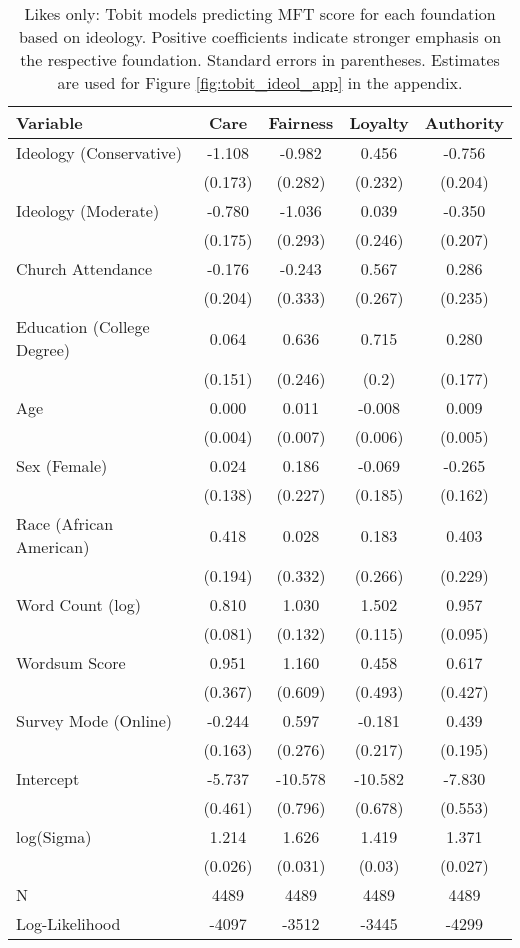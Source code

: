 \begin{table}[ht]
\centering
\caption{Likes only: Tobit models predicting MFT score for each foundation based 
           on ideology. Positive coefficients indicate stronger emphasis on the respective 
           foundation. Standard errors in parentheses. Estimates are used for 
           Figure \ref{fig:tobit_ideol_app} in the appendix.} 
\label{tab:tobit_like}
\begingroup\footnotesize
\begin{tabular}{lcccc}
  \hline
Variable & Care & Fairness & Loyalty & Authority \\ 
  \hline
Ideology (Conservative) & -1.108 &  -0.982 &   0.456 & -0.756 \\ 
   & (0.173) & (0.282) & (0.232) & (0.204) \\ 
  Ideology (Moderate) & -0.780 &  -1.036 &   0.039 & -0.350 \\ 
   & (0.175) & (0.293) & (0.246) & (0.207) \\ 
  Church Attendance & -0.176 &  -0.243 &   0.567 &  0.286 \\ 
   & (0.204) & (0.333) & (0.267) & (0.235) \\ 
  Education (College Degree) &  0.064 &   0.636 &   0.715 &  0.280 \\ 
   & (0.151) & (0.246) & (0.2) & (0.177) \\ 
  Age &  0.000 &   0.011 &  -0.008 &  0.009 \\ 
   & (0.004) & (0.007) & (0.006) & (0.005) \\ 
  Sex (Female) &  0.024 &   0.186 &  -0.069 & -0.265 \\ 
   & (0.138) & (0.227) & (0.185) & (0.162) \\ 
  Race (African American) &  0.418 &   0.028 &   0.183 &  0.403 \\ 
   & (0.194) & (0.332) & (0.266) & (0.229) \\ 
  Word Count (log) &  0.810 &   1.030 &   1.502 &  0.957 \\ 
   & (0.081) & (0.132) & (0.115) & (0.095) \\ 
  Wordsum Score &  0.951 &   1.160 &   0.458 &  0.617 \\ 
   & (0.367) & (0.609) & (0.493) & (0.427) \\ 
  Survey Mode (Online) & -0.244 &   0.597 &  -0.181 &  0.439 \\ 
   & (0.163) & (0.276) & (0.217) & (0.195) \\ 
  Intercept & -5.737 & -10.578 & -10.582 & -7.830 \\ 
   & (0.461) & (0.796) & (0.678) & (0.553) \\ 
  log(Sigma) &  1.214 &   1.626 &   1.419 &  1.371 \\ 
   & (0.026) & (0.031) & (0.03) & (0.027) \\ 
   \hline
N & 4489 & 4489 & 4489 & 4489 \\ 
  Log-Likelihood & -4097 & -3512 & -3445 & -4299 \\ 
   \hline
\end{tabular}
\endgroup
\end{table}
